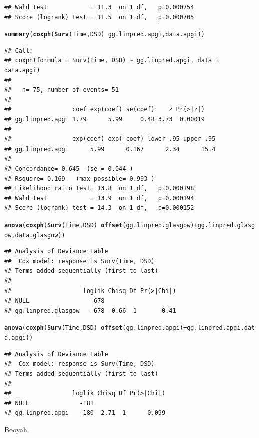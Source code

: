 \documentclass{article}\usepackage[]{graphicx}\usepackage[]{color}
\makeatletter
\newcommand{\hlopt}[1]{\textcolor[rgb]{0,0,0}{#1}}%
\newcommand{\hlstd}[1]{\textcolor[rgb]{0.345,0.345,0.345}{#1}}%
\newcommand{\hlkwd}[1]{\textcolor[rgb]{0.737,0.353,0.396}{\textbf{#1}}}%
\newenvironment{kframe}{%
 \def\at@end@of@kframe{}%
 \ifinner\ifhmode%
  \def\at@end@of@kframe{\end{minipage}}%
  \begin{minipage}{\columnwidth}%
 \fi\fi%
 \def\FrameCommand##1{\hskip\@totalleftmargin \hskip-\fboxsep
 \colorbox{shadecolor}{##1}\hskip-\fboxsep
     \hskip-\linewidth \hskip-\@totalleftmargin \hskip\columnwidth}%
 \MakeFramed {\advance\hsize-\width
   \@totalleftmargin\z@ \linewidth\hsize
   \@setminipage}}%
 {\par\unskip\endMakeFramed%
 \at@end@of@kframe}
\newenvironment{knitrout}{}{} %
\makeatother
\begin{document}
\begin{knitrout}
\begin{kframe}
\begin{verbatim}
## Wald test            = 11.3  on 1 df,   p=0.000754
## Score (logrank) test = 11.5  on 1 df,   p=0.000705
\end{verbatim}
\begin{alltt}
\hlkwd{summary}\hlstd{(}\hlkwd{coxph}\hlstd{(}\hlkwd{Surv}\hlstd{(Time, DSD)} \hlopt{~} \hlstd{gg.linpred.apgi, data.apgi))}
\end{alltt}
\begin{verbatim}
## Call:
## coxph(formula = Surv(Time, DSD) ~ gg.linpred.apgi, data = data.apgi)
## 
##   n= 75, number of events= 51 
## 
##                 coef exp(coef) se(coef)    z Pr(>|z|)
## gg.linpred.apgi 1.79      5.99     0.48 3.73  0.00019
## 
##                 exp(coef) exp(-coef) lower .95 upper .95
## gg.linpred.apgi      5.99      0.167      2.34      15.4
## 
## Concordance= 0.645  (se = 0.044 )
## Rsquare= 0.169   (max possible= 0.993 )
## Likelihood ratio test= 13.8  on 1 df,   p=0.000198
## Wald test            = 13.9  on 1 df,   p=0.000194
## Score (logrank) test = 14.3  on 1 df,   p=0.000152
\end{verbatim}
\begin{alltt}
\hlkwd{anova}\hlstd{(}\hlkwd{coxph}\hlstd{(}\hlkwd{Surv}\hlstd{(Time, DSD)} \hlopt{~} \hlkwd{offset}\hlstd{(gg.linpred.glasgow)} \hlopt{+} \hlstd{gg.linpred.glasgow, data.glasgow))}
\end{alltt}
\begin{verbatim}
## Analysis of Deviance Table
##  Cox model: response is Surv(Time, DSD)
## Terms added sequentially (first to last)
## 
##                    loglik Chisq Df Pr(>|Chi|)
## NULL                 -678                    
## gg.linpred.glasgow   -678  0.66  1       0.41
\end{verbatim}
\begin{alltt}
\hlkwd{anova}\hlstd{(}\hlkwd{coxph}\hlstd{(}\hlkwd{Surv}\hlstd{(Time, DSD)} \hlopt{~} \hlkwd{offset}\hlstd{(gg.linpred.apgi)} \hlopt{+} \hlstd{gg.linpred.apgi, data.apgi))}
\end{alltt}
\begin{verbatim}
## Analysis of Deviance Table
##  Cox model: response is Surv(Time, DSD)
## Terms added sequentially (first to last)
## 
##                 loglik Chisq Df Pr(>|Chi|)
## NULL              -181                    
## gg.linpred.apgi   -180  2.71  1      0.099
\end{verbatim}
\end{kframe}
\end{knitrout}
Booyah.
\end{document}
